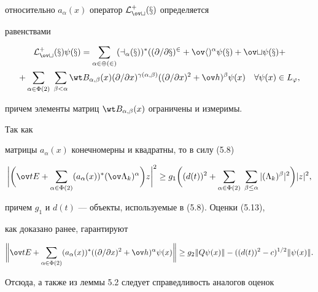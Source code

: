 \begin{pf}
относительно $a_\alpha(x)$ оператор $\cal L^+_{\ov t}(x)$ определяется 


равенствами 


\begin{multline*} 


\cal L^+_{\ov t}(x)\psi(x)= 


\sum_{\alpha\in\Phi(2)}(a_\alpha(x))^*((\partial/\partial x)^2+ 


\ov h)^\alpha\psi(x)+\ov t\psi(x)+ \\ 


+ \sum_{\alpha\in\Phi(2)}\;\sum_{\beta<\alpha} 


\wt B_{\alpha,\beta}(x)(\partial/\partial x)^{\gamma(\alpha,\beta)} 


((\partial/\partial x)^2+\ov h)^\beta\psi(x)\quad 


\forall\psi(x)\in L_\varphi, 


\end{multline*} 


причем элементы матриц $\wt B_{\alpha,\beta}(x)$ ограничены и измеримы. 


Так как 


матрицы $a_\alpha(x)$ конечномерны и квадратны, то в силу (5.8) 


\begin{equation} 


\bigg|\bigg(\ov t E+ 


\sum_{\alpha\in\Phi(2)}(a_\alpha(x))^*(\ov\Lambda_k)^\alpha\bigg) 


z\bigg|^2\ge g_1\bigg((d(t))^2+ 


\sum_{\alpha\in\Phi(2)}\;\sum_{\beta\le\alpha} 


|(\Lambda_k)^\beta|^2\bigg)|z|^2, 


\end{equation} 


причем $g_1$ и $d(t)$ --- объекты, используемые в (5.8). Оценки (5.13), 


как доказано ранее, гарантируют 


$$ 


\bigg\|\ov t E+ 


\sum_{\alpha\in\Phi(2)}(a_\alpha(x))^*((\partial/\partial x)^2+ 


\ov h)^\alpha\psi(x)\bigg\|\ge g_2\|Q\psi(x)\|- 


((d(t))^2-c)^{1/2}\|\psi(x)\|. 


$$ 


Отсюда, а также из леммы 5.2 следует справедливость аналогов оценок 



\end{pf}
